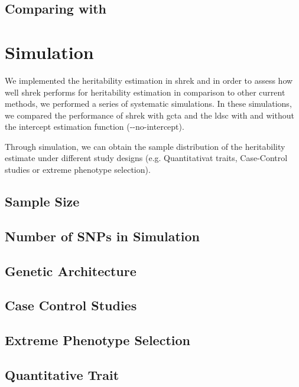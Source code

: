 		\subsection{Comparing with }
	
		
	\section{Simulation}
		We implemented the heritability estimation in \gls{shrek} and in order to assess how well \gls{shrek} performs for heritability estimation in comparison to other current methods, we performed a series of systematic simulations.
		In these simulations, we compared the performance of \gls{shrek} with \gls{gcta}\citep{Yang2011} and the \gls{ldsc}\citep{Bulik-Sullivan2015} with and without the intercept estimation function (-{}-no-intercept). 
		
		Through simulation, we can obtain the sample distribution of the heritability estimate under different study designs (e.g. Quantitativat traits, Case-Control studies or extreme phenotype selection). 
		

		\subsection{Sample Size}
		\subsection{Number of SNPs in Simulation}
		\subsection{Genetic Architecture} %
		\subsection{Case Control Studies}
		\subsection{Extreme Phenotype Selection}
		\subsection{Quantitative Trait}
		
